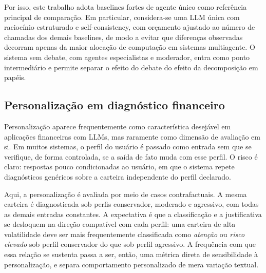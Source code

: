 Por isso, este trabalho adota baselines fortes de agente único como
referência principal de comparação. Em particular, considera-se uma LLM
única com raciocínio estruturado e self-consistency, com orçamento
ajustado ao número de chamadas dos demais baselines, de modo a evitar que
diferenças observadas decorram apenas da maior alocação de computação em
sistemas multiagente. O sistema sem debate, com agentes especialistas e
moderador, entra como ponto intermediário e permite separar o efeito do
debate do efeito da decomposição em papéis.

\subsection{Personalização em diagnóstico financeiro}

Personalização aparece frequentemente como característica desejável em
aplicações financeiras com LLMs, mas raramente como dimensão de avaliação
em si. Em muitos sistemas, o perfil do usuário é passado como entrada sem
que se verifique, de forma controlada, se a saída de fato muda com esse
perfil. O risco é claro: respostas pouco condicionadas ao usuário, em que
o sistema repete diagnósticos genéricos sobre a carteira independente do
perfil declarado.

Aqui, a personalização é avaliada por meio de casos contrafactuais. A
mesma carteira é diagnosticada sob perfis conservador, moderado e
agressivo, com todas as demais entradas constantes. A expectativa é que a
classificação e a justificativa se desloquem na direção compatível com
cada perfil: uma carteira de alta volatilidade deve ser mais
frequentemente classificada como \textit{atenção} ou \textit{risco
elevado} sob perfil conservador do que sob perfil agressivo. A frequência
com que essa relação se sustenta passa a ser, então, uma métrica direta
de sensibilidade à personalização, e separa comportamento personalizado
de mera variação textual.
